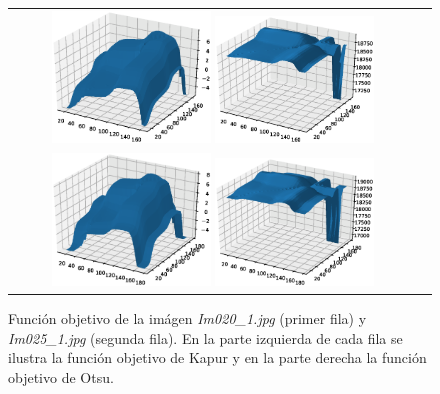 \documentclass[preprint,12pt]{elsarticle}
\begin{document}
\begin{figure}[H]
\centering
\begin{tabular}{cc}
     \includegraphics[width=0.4\textwidth]{Im020_1landscape_Kapur.eps}
   \includegraphics[width=0.4\textwidth]{Im020_1landscape_Otsu.eps} \\
   \includegraphics[width=0.4\textwidth]{Im025_1landscape_Kapur.eps}
   \includegraphics[width=0.4\textwidth]{Im025_1landscape_Otsu.eps}
\end{tabular}
\caption{Función objetivo de la imágen \textit{Im020\_1.jpg} (primer fila) y \textit{Im025\_1.jpg} (segunda fila). En la parte izquierda de cada fila se ilustra la función objetivo de Kapur y en la parte derecha la función objetivo de Otsu.}\label{img:landscape}
\end{figure}
\end{document}
